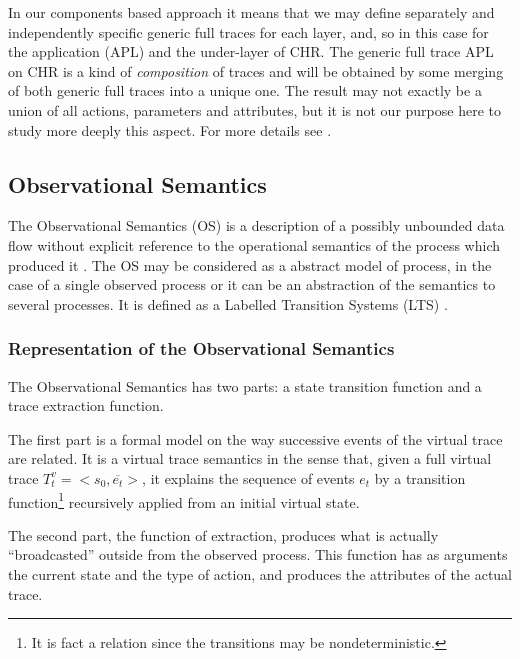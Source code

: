 In our components based approach it means that we may define separately and independently specific generic full traces for each layer, and, so in this case for the application (APL) and the under-layer of CHR. The generic full trace APL on CHR is a kind of {\em composition} of traces and will be obtained by some merging of both generic full traces into a unique one. The result may not exactly be a union of all actions, parameters and attributes, but it is not our purpose here to study more deeply this aspect. For more details see \cite{TMTmanuscript}.






\subsection{Observational Semantics}

The Observational Semantics (OS) is a description of a possibly unbounded
data flow without explicit reference to the operational semantics of the
process which produced it \cite{deransart2007observational}. The
OS may be considered as a abstract model of process, in the
case of a single observed process or it can be an abstraction of the
semantics to several processes. It is defined as a Labelled
Transition Systems (LTS) \cite{gilmore2005trends}.





\subsubsection{Representation of the Observational Semantics}

The Observational Semantics has two parts: a state transition function and a trace extraction function.

The first part is a formal model on the way successive events of the virtual trace are related. 
It is a virtual trace semantics in the sense that, given a full virtual trace \newline $T^v_t = <s_0, \overline{e_t}>$, it explains the sequence of events $e_t$ by a transition function\footnote{It is fact a relation since the transitions may be nondeterministic.} recursively applied from an initial virtual state.



\vspace{1mm}
The second part, the function of extraction, produces what is actually ``broadcasted'' outside from the observed process. This function has as arguments the current state and the type of action, and produces the attributes of the actual trace.

